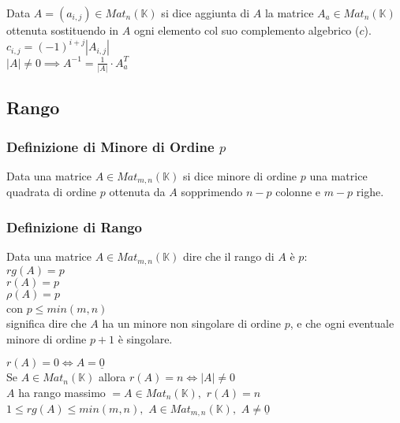 \documentclass[a4paper, twoside, italian, 11pt]{book}
\newcommand{\K}{\mathbb{K}}
\begin{document}
Data $A = (a_{i,j}) \in Mat_n(\K)$ si dice aggiunta di $A$ la matrice $A_a \in Mat_n(\K)$ ottenuta sostituendo in $A$ ogni elemento col suo complemento algebrico ($c$). \\

\noindent
$c_{i,j} = (-1)^{i+j} \left | A_{i,j} \right |$ \\

\noindent
$\left | A \right | \neq 0 \implies A^{-1} = \frac{1}{\left | A \right |} \cdot A_a^T$


\subsection{Rango}


\subsubsection{Definizione di Minore di Ordine $p$}

Data una matrice $A \in Mat_{m,n}(\K)$ si dice minore di ordine $p$ una matrice quadrata di ordine $p$ ottenuta da $A$ sopprimendo $n-p$ colonne e $m-p$ righe.

\subsubsection{Definizione di Rango}

Data una matrice $A \in Mat_{m,n}(\K)$ dire che il rango di $A$ è $p$: \\

\noindent
$rg(A) = p$ \\
$r(A) = p$ \\
$\rho(A) = p$ \\

\noindent
con $p \leq min(m, n)$ \\

\noindent
significa dire che $A$ ha un minore non singolare di ordine $p$, e che ogni eventuale minore di ordine $p + 1$ è singolare.

\noindent
$r(A) = 0 \iff A = \underline{0}$ \\

\noindent
Se $A \in Mat_n(\K)$ allora $r(A) = n \iff \left | A \right | \neq 0$ \\

\noindent
$A$ ha rango massimo $= A \in Mat_n(\K),$ $r(A) = n$ \\

\noindent
$1 \leq rg(A) \leq min(m,n),$ $A \in Mat_{m,n}(\K),$ $A \neq \underline{0}$
\end{document}
